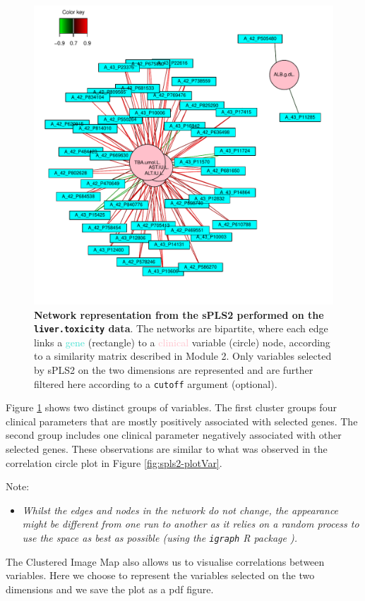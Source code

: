\documentclass[]{book}
\providecommand{\tightlist}{%
  \setlength{\itemsep}{0pt}\setlength{\parskip}{0pt}}
\begin{document}
\begin{figure}

{\centering \includegraphics[width=0.5\linewidth]{network_liver} 

}

\caption{\textbf{Network representation from the sPLS2
performed on the \texttt{liver.toxicity} data}. The networks are
bipartite, where each edge links a \textcolor{turquoise}{gene}
(rectangle) to a \textcolor{pink}{clinical} variable (circle) node,
according to a similarity matrix described in Module 2. Only variables
selected by sPLS2 on the two dimensions are represented and are further
filtered here according to a \texttt{cutoff} argument (optional).}\label{fig:spls2-network}
\end{figure}









Figure \ref{fig:spls2-network} shows two distinct groups of variables.
The first cluster groups four clinical parameters that are mostly
positively associated with selected genes. The second group includes one
clinical parameter negatively associated with other selected genes.
These observations are similar to what was observed in the correlation
circle plot in Figure \ref{fig:spls2-plotVar}.

Note:

\begin{itemize}
\tightlist
\item
  \emph{Whilst the edges and nodes in the network do not change, the
  appearance might be different from one run to another as it relies on
  a random process to use the space as best as possible (using the
  \texttt{igraph} R package \citet{csa06}).}
\end{itemize}

The Clustered Image Map also allows us to visualise correlations between
variables. Here we choose to represent the variables selected on the two
dimensions and we save the plot as a pdf figure.
\end{document}
